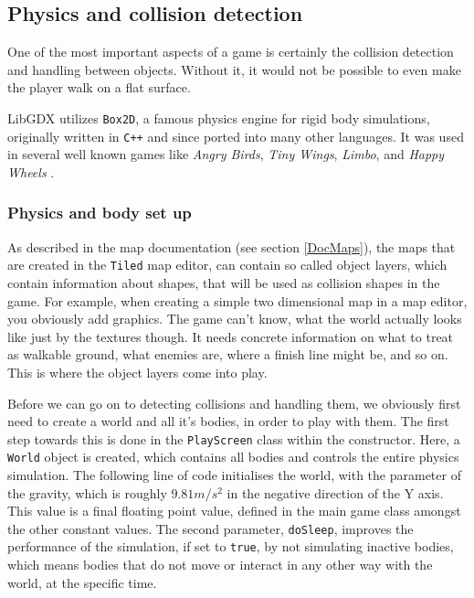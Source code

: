\documentclass[12p]{article}
\begin{document}
\subsection{Physics and collision detection} \label{DocCollisions}

One of the most important aspects of a game is certainly the collision detection and handling between objects. Without it, it would not be possible to even make the player walk on a flat surface.

LibGDX utilizes \texttt{Box2D}, a famous physics engine for rigid body simulations, originally written in \texttt{C++} and since ported into many other languages. It was used in several well known games like \emph{Angry Birds}, \emph{Tiny Wings}, \emph{Limbo}, and \emph{Happy Wheels} \cite{box2DGithub}\cite{box2DWikipedia}.

\subsubsection{Physics and body set up} \label{DocPhysicsAndBodySetup}

As described in the map documentation (see section \ref{DocMaps}), the maps that are created in the \texttt{Tiled} map editor, can contain so called object layers, which contain information about shapes, that will be used as collision shapes in the game. For example, when creating a simple two dimensional map in a map editor, you obviously add graphics. The game can't know, what the world actually looks like just by the textures though. It needs concrete information on what to treat as walkable ground, what enemies are, where a finish line might be, and so on. This is where the object layers come into play.

Before we can go on to detecting collisions and handling them, we obviously first need to create a world and all it's bodies, in order to play with them. The first step towards this is done in the \texttt{PlayScreen} class within the constructor. Here, a \texttt{World} object is created, which contains all bodies and controls the entire physics simulation. The following line of code initialises the world, with the parameter of the gravity, which is roughly $9.81m/s^2$ in the negative direction of the Y axis. This value is a final floating point value, defined in the main game class amongst the other constant values. The second parameter, \texttt{doSleep}, improves the performance of the simulation, if set to \texttt{true}, by not simulating inactive bodies, which means bodies that do not move or interact in any other way with the world, at the specific time.
\end{document}
